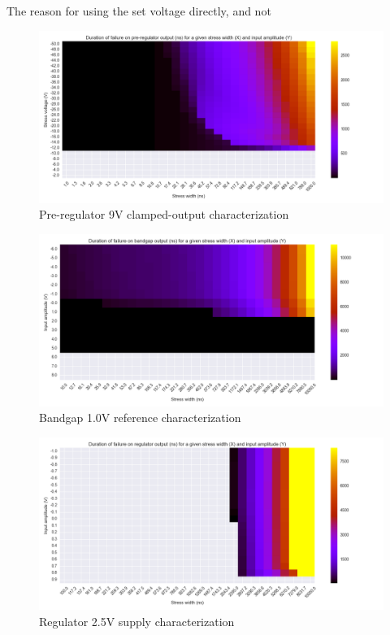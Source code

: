 The reason for using the set voltage directly, and not

\begin{figure}[!htbp]
  \centering
  \includegraphics[width=\textwidth]{src/4/figures/preregulator_cz.png}
  \caption{Pre-regulator 9V clamped-output characterization}
  \label{pre_regu_wb}
\end{figure}

\begin{figure}[!htbp]
  \centering
  \includegraphics[width=\textwidth]{src/4/figures/bandgap_cz.png}
  \caption{Bandgap 1.0V reference characterization}
  \label{bandgap_wb}
\end{figure}

\begin{figure}[!htbp]
  \centering
  \includegraphics[width=\textwidth]{src/4/figures/regulator_cz.png}
  \caption{Regulator 2.5V supply characterization}
  \label{regu_wb}
\end{figure}

